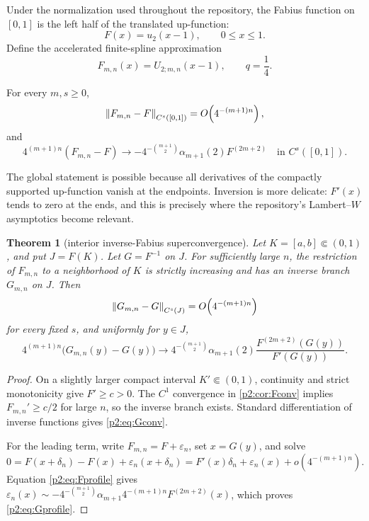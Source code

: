 \documentclass[11pt,oneside]{article}
\numberwithin{equation}{section}
\newtheorem{theorem}{Theorem}[section]
\theoremstyle{definition}
\theoremstyle{remark}
\begin{document}
Under the normalization used throughout the repository, the Fabius function on
\([0,1]\) is the left half of the translated up-function:
\begin{equation}
 F(x)=u_2(x-1),\qquad 0\leq x\leq1.
 \label{p2:eq:Fshift}
\end{equation}
Define the accelerated finite-spline approximation
\begin{equation}
 F_{m,n}(x)=U_{2;m,n}(x-1),\qquad q=\frac14.
 \label{p2:eq:Fapprox}
\end{equation}

\begin{corollary}
\label{p2:cor:Fconv}
For every \(m,s\geq0\),
\begin{equation}
 \left\lVert F_{m,n}-F\right\rVert_{C^s([0,1])}
 =O\!\left(4^{-(m+1)n}\right),
 \label{p2:eq:Fconv}
\end{equation}
and
\begin{equation}
 4^{(m+1)n}(F_{m,n}-F)
 \longrightarrow
 -4^{-\binom{m+1}{2}}\alpha_{m+1}(2)F^{(2m+2)}
 \quad\text{in }C^s([0,1]).
 \label{p2:eq:Fprofile}
\end{equation}
\end{corollary}

The global statement is possible because all derivatives of the compactly
supported up-function vanish at the endpoints. Inversion is more delicate:
\(F'(x)\) tends to zero at the ends, and this is precisely where the repository's
Lambert--\(W\) asymptotics become relevant.

\begin{theorem}[interior inverse-Fabius superconvergence]
\label{p2:thm:inverse}
Let \(K=[a,b]\Subset(0,1)\), and put \(J=F(K)\). Let \(G=F^{-1}\) on \(J\).
For sufficiently large \(n\), the restriction of \(F_{m,n}\) to a neighborhood
of \(K\) is strictly increasing and has an inverse branch \(G_{m,n}\) on \(J\).
Then
\begin{equation}
 \left\lVert G_{m,n}-G\right\rVert_{C^s(J)}
 =O\!\left(4^{-(m+1)n}\right)
 \label{p2:eq:Gconv}
\end{equation}
for every fixed \(s\), and uniformly for \(y\in J\),
\begin{equation}
 4^{(m+1)n}\bigl(G_{m,n}(y)-G(y)\bigr)
 \longrightarrow
 4^{-\binom{m+1}{2}}\alpha_{m+1}(2)
 \frac{F^{(2m+2)}(G(y))}{F'(G(y))}.
 \label{p2:eq:Gprofile}
\end{equation}
\end{theorem}

\begin{proof}
On a slightly larger compact interval \(K'\Subset(0,1)\), continuity and strict
monotonicity give \(F'\geq c>0\). The \(C^1\) convergence in
\cref{p2:cor:Fconv} implies \(F_{m,n}'\geq c/2\) for large \(n\), so the inverse
branch exists. Standard differentiation of inverse functions gives
\eqref{p2:eq:Gconv}.

For the leading term, write \(F_{m,n}=F+\varepsilon_n\), set \(x=G(y)\), and
solve
\[
 0=F(x+\delta_n)-F(x)+\varepsilon_n(x+\delta_n)
 =F'(x)\delta_n+\varepsilon_n(x)+o(4^{-(m+1)n}).
\]
Equation \eqref{p2:eq:Fprofile} gives
\(\varepsilon_n(x)\sim
 -4^{-\binom{m+1}{2}}\alpha_{m+1}4^{-(m+1)n}F^{(2m+2)}(x)\),
which proves \eqref{p2:eq:Gprofile}.
\end{proof}
\end{document}
